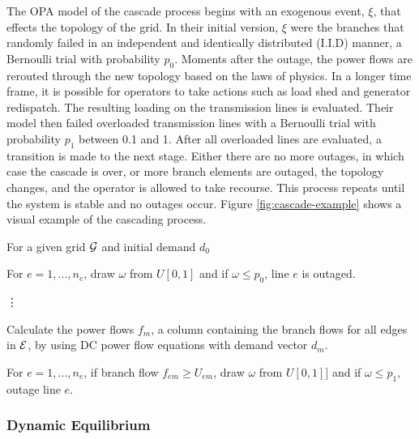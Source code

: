 The OPA model of the cascade process begins with an exogenous event, $\xi$, that effects the topology of the grid.  In their initial version, $\xi$ were the branches that randomly failed in an independent and identically distributed (I.I.D) manner, a Bernoulli trial with probability $p_0$.  Moments after the outage, the power flows are rerouted through the new topology based on the laws of physics.  In a longer time frame, it is possible for operators to take actions such as load shed and generator redispatch.  The resulting loading on the transmission lines is evaluated.  Their model then failed overloaded transmission lines with a Bernoulli trial with probability $p_1$ between  0.1 and 1.  After all overloaded lines are evaluated, a transition is made to the next stage.  Either there are no more outages, in which case the cascade is over, or more branch elements are outaged, the topology changes, and the operator is allowed to take recourse.  This process repeats until the system is stable and no outages occur.  Figure \ref{fig:cascade-example} shows a visual example of the cascading process.

For a given grid $\mathcal{G}$ and initial demand $d_0$
\begin{description}\label{fast_opa}
\item[ Initial $ \xi $ ]  For $e=1,...,n_e$, draw $\omega$ from $U[0,1]$ and if $\omega \le p_0$, line $e$ is outaged.
\item[ ] \hspace{35px} \vdots 
\item[ Stage $m$ ]  Calculate the power flows $f_{m}$, a column containing the branch flows for all edges in $\mathcal{E}$, by using DC power flow equations with demand vector $d_m$. 

For $e=1,...,n_e$, if branch flow $f_{em} \ge U_{em}$, draw $\omega$ from $U[0,1]]$ and if $\omega \le p_1$, outage line $e$.
\end{description}




\subsubsection{Dynamic Equilibrium}

